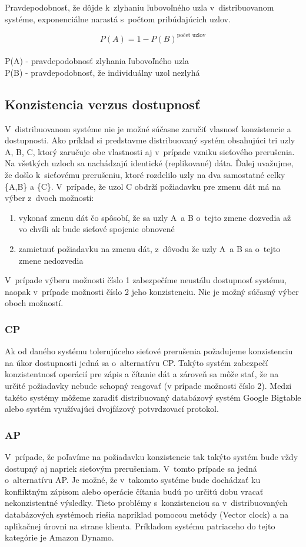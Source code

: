 \documentclass[11pt,twoside,a4paper]{book}
\begin{document}
\noindent
Pravdepodobnosť, že dôjde k~zlyhaniu ľubovoľného uzla v~distribuovanom systéme, exponenciálne narastá s~počtom pribúdajúcich uzlov.

$$P(A) = 1 - P(B)^{\textrm{počet uzlov}}$$
\\
P(A) - pravdepodobnosť zlyhania ľubovoľného uzla \\
P(B) - pravdepodobnosť, že individuálny uzol nezlyhá

\subsection{Konzistencia verzus dostupnosť}

V~distribuovanom systéme nie je možné súčasne zaručiť vlasnosť konzistencie a dostupnosti. Ako príklad si predstavme distribuovaný systém obsahujúci tri uzly A, B, C, ktorý zaručuje obe vlastnosti aj v~prípade vzniku sieťového prerušenia. Na všetkých uzloch sa nachádzajú identické (replikované) dáta. Ďalej uvažujme, že došlo k~sieťovému prerušeniu, ktoré rozdelilo uzly na dva samostatné celky \{A,B\} a \{C\}. V~prípade, že uzol C obdrží požiadavku pre zmenu dát má na výber z~dvoch možnosti:
\begin{enumerate}
 \item vykonať zmenu dát čo spôsobí, že sa uzly A~a B o~tejto zmene dozvedia až vo chvíli ak bude sieťové spojenie obnovené
 \item zamietnuť požiadavku na zmenu dát, z~dôvodu že uzly A~a B sa o~tejto zmene nedozvedia
\end{enumerate}

V~prípade výberu možnosti číslo 1 zabezpečíme neustálu dostupnosť systému, naopak v~prípade možnosti číslo 2 jeho konzistenciu. Nie je možný súčasný výber oboch možností.

\subsubsection*{CP}
Ak od daného systému tolerujúceho sieťové prerušenia požadujeme konzistenciu na úkor dostupnosti jedná sa o~alternatívu CP. Takýto systém zabezpečí konzistentnosť operácií pre zápis a čítanie dát a zároveň sa môže stať, že na určité požiadavky nebude schopný reagovať (v prípade možnosti číslo 2). Medzi takéto systémy môžeme zaradiť distribuovaný databázový systém Google Bigtable alebo systém využívajúci dvojfázový potvrdzovací protokol.

\subsubsection*{AP}
V~prípade, že poľavíme na požiadavku konzistencie tak takýto systém bude vždy dostupný aj napriek sieťovým prerušeniam. V~tomto prípade sa jedná o~alternatívu AP. Je možné, že v~takomto systéme bude dochádzať ku konfliktným zápisom alebo operácie čítania budú po určitú dobu vracať nekonzistentné výsledky. Tieto problémy s~konzistenciou sa v~distribuovaných databázových systémoch riešia napríklad pomocou metódy  (Vector clock) \cite{decandia2007dynamo} a na aplikačnej úrovni na strane klienta. Príkladom systému patriaceho do tejto kategórie je Amazon Dynamo.
\end{document}
